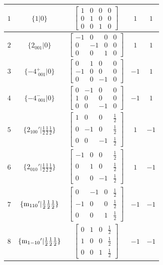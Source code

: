 \documentclass[fleqn,8pt]{jsarticle}
\begin{document}
\begin{longtable}{ccccc}
$ 1 $ & $ \{1|0\} $ & $ \begin{bmatrix} 1 & 0 & 0 & 0 \\ 0 & 1 & 0 & 0 \\ 0 & 0 & 1 & 0 \end{bmatrix} $ & $ 1 $ & $ 1 $ \\ \hline
$ 2 $ & $ \{2{}_{001}|0\} $ & $ \begin{bmatrix} -1 & 0 & 0 & 0 \\ 0 & -1 & 0 & 0 \\ 0 & 0 & 1 & 0 \end{bmatrix} $ & $ 1 $ & $ 1 $ \\ \hline
$ 3 $ & $ \{-4^{+}_{\,\,001}|0\} $ & $ \begin{bmatrix} 0 & 1 & 0 & 0 \\ -1 & 0 & 0 & 0 \\ 0 & 0 & -1 & 0 \end{bmatrix} $ & $ -1 $ & $ 1 $ \\ \hline
$ 4 $ & $ \{-4^{-}_{\,\,001}|0\} $ & $ \begin{bmatrix} 0 & -1 & 0 & 0 \\ 1 & 0 & 0 & 0 \\ 0 & 0 & -1 & 0 \end{bmatrix} $ & $ -1 $ & $ 1 $ \\ \hline
$ 5 $ & $ \{2{}_{100}{}'|\frac{1}{2} \frac{1}{2} \frac{1}{2}\} $ & $ \begin{bmatrix} 1 & 0 & 0 & \frac{1}{2} \\ 0 & -1 & 0 & \frac{1}{2} \\ 0 & 0 & -1 & \frac{1}{2} \end{bmatrix} $ & $ 1 $ & $ -1 $ \\ \hline
$ 6 $ & $ \{2{}_{010}{}'|\frac{1}{2} \frac{1}{2} \frac{1}{2}\} $ & $ \begin{bmatrix} -1 & 0 & 0 & \frac{1}{2} \\ 0 & 1 & 0 & \frac{1}{2} \\ 0 & 0 & -1 & \frac{1}{2} \end{bmatrix} $ & $ 1 $ & $ -1 $ \\ \hline
$ 7 $ & $ \{{\rm m}_{110}{}'|\frac{1}{2} \frac{1}{2} \frac{1}{2}\} $ & $ \begin{bmatrix} 0 & -1 & 0 & \frac{1}{2} \\ -1 & 0 & 0 & \frac{1}{2} \\ 0 & 0 & 1 & \frac{1}{2} \end{bmatrix} $ & $ -1 $ & $ -1 $ \\ \hline
$ 8 $ & $ \{{\rm m}_{1-10}{}'|\frac{1}{2} \frac{1}{2} \frac{1}{2}\} $ & $ \begin{bmatrix} 0 & 1 & 0 & \frac{1}{2} \\ 1 & 0 & 0 & \frac{1}{2} \\ 0 & 0 & 1 & \frac{1}{2} \end{bmatrix} $ & $ -1 $ & $ -1 $ \\
\end{longtable}
\end{document}
